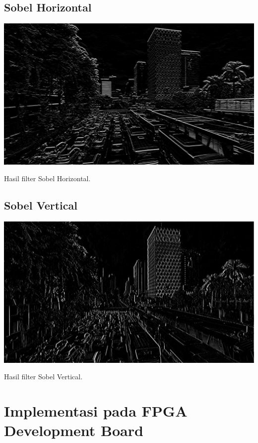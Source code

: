 \subsection{Sobel Horizontal}
\begin{afigure}
    \includegraphics[width=\linewidth, center]{images/output-image/input1-sobelhor.png}
    \caption{Hasil filter Sobel Horizontal.}
    \label{fig:output-sobelhor}
\end{afigure}

\subsection{Sobel Vertical}
\blindtext
\begin{afigure}
    \includegraphics[width=\linewidth, center]{images/output-image/input1-sobelver.png}
    \caption{Hasil filter Sobel Vertical.}
    \label{fig:output-sobelver}
\end{afigure}

\section{Implementasi pada FPGA Development Board}
\blindtext
